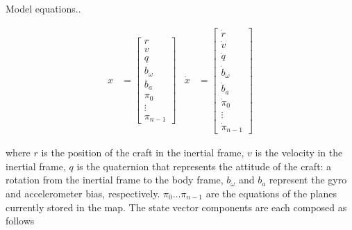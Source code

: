 \documentclass[]{article}
\begin{document}
{Model equations..

\begin{align}
	x &= 
	\left[
	\begin{matrix}
		r \\
		v \\
		q \\
		b_\omega \\
		b_a \\
		\pi_0 \\
		\vdots \\
		\pi_{n-1}
	\end{matrix}
	\right]
	&
	\dot{x} &= 
	\left[
	\begin{matrix}
		\dot{r} \\
		\dot{v} \\
		\dot{q} \\
		\dot{b}_\omega \\
		\dot{b}_a \\
		\dot{\pi}_0 \\
		\vdots \\
		\dot{\pi}_{n-1}
	\end{matrix}
	\right]
\end{align}

where $r$ is the position of the craft in the inertial frame, $v$ is the velocity in the inertial frame, $q$ is the quaternion that represents the attitude of the craft: a rotation from the inertial frame to the body frame, $b_\omega$ and $b_a$ represent the gyro and accelerometer bias, respectively. $\pi_0 \hdots \pi_{n-1}$ are the equations of the planes currently stored in the map.
The state vector components are each composed as follows

}
\end{document}
